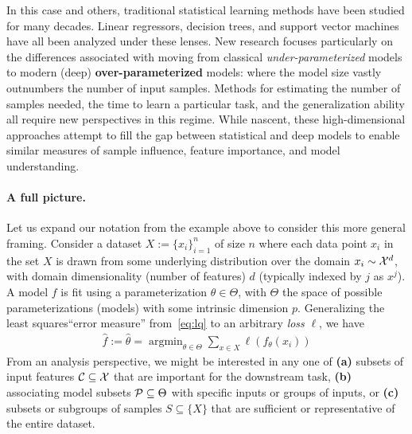 In this case and others, traditional statistical learning methods 
have been studied 
for many decades.
Linear regressors, decision trees, and support vector machines
have all been analyzed under these lenses.
New research focuses
particularly on the differences
associated with moving from classical \textit{under-parameterized} models to
modern (deep) \textbf{over-parameterized} models: where
the model size vastly outnumbers the number
of input samples.
Methods for estimating the number of samples needed,
the time to learn a particular task,
and the generalization ability 
all require new perspectives in this regime.
While nascent, these high-dimensional approaches
attempt to fill the gap between
statistical and deep models to enable similar measures of sample influence, feature importance, and model understanding. 

\paragraph{A full picture.}
Let us expand our notation from the example above to consider this more general framing.
Consider a dataset $X:=\{x_i\}_{i=1}^n$ of size $n$ where each data point $x_i$ in the set $X$ is drawn from some underlying distribution over the domain $x_i \sim \mathcal{X}^d$, 
with domain dimensionality (number of features) $d$ (typically indexed by $j$ as $x^j$).
A model $f$ is fit using a parameterization $\theta \in \Theta$,
with $\Theta$ the space of possible parameterizations (models) with some intrinsic dimension $p$. 
Generalizing the least squares``error measure'' from~\eqref{eq:lq} to an arbitrary \textit{loss} $\ell$, we have
\begin{align}\label{eq:learning}
    \hat{f}:=\hat{\theta} = \mathop{\arg\min}_{\theta\in\Theta} \sum_{x \in X} \ell(f_\theta(x_i))
\end{align}
From an analysis perspective, 
we might be interested in any one of 
\textbf{(a)} subsets of input features $\mathcal{C} \subseteq \mathcal{X}$ that are important for the downstream task,
\textbf{(b)} associating model subsets $\mathcal{P} \subseteq \Theta$ with specific inputs or groups of inputs, or 
\textbf{(c)} subsets or subgroups of samples $S \subseteq \{X\}$ that are sufficient or representative of the entire dataset.

